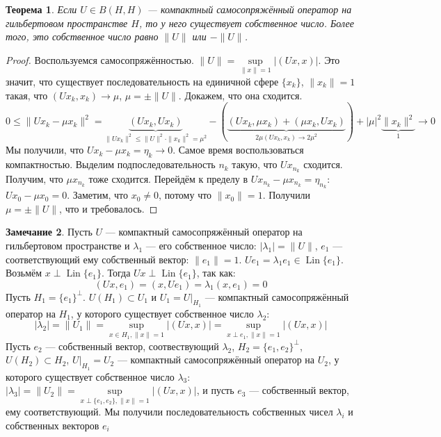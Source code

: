 \documentclass[11pt,openany,a4paper]{scrartcl}
\theoremstyle{plain}
\newtheorem{theorem}{Теорема}[subsection]
\theoremstyle{definition}
\newtheorem{remark}[theorem]{Замечание}
\DeclareMathOperator{\Lin}{Lin}
\begin{document}
\begin{theorem}
    Если $U \in B(H, H)$ — компактный самосопряжённый оператор на гильбертовом пространстве $H$, то
    у него существует собственное число. Более того, это собственное число равно $\|U\|$ или
    $-\|U\|$.
\end{theorem}
\begin{proof}
    Воспользуемся самосопряжённостью. $\|U\| = \sup\limits_{\|x\|=1}|(Ux, x)|$. Это значит,
    что существует последовательность на единичной сфере $\{x_k\}$, $\|x_k\|=1$ такая, что
    $(Ux_k, x_k) \to \mu$, $\mu = \pm \|U\|$. Докажем, что она сходится.
    $$
    0 \leqslant \|Ux_k - \mu x_k\|^2 =
    \underbrace{(Ux_k, Ux_k)}_{\|Ux_k\|^2 \leqslant \|U\|^2 \cdot \|x_k\|^2 = \mu^2} -
    (\underbrace{(Ux_k, \mu x_k) + (\mu x_k, Ux_k)}_{2\mu(Ux_k, x_k) \to 2 \mu^2})
    + |\mu|^2\underbrace{\|x_k\|^2}_{1} \to 0
    $$
    Мы получили, что $Ux_k - \mu x_k = \eta_k \to 0$. Самое время воспользоваться компактностью.
    Выделим подпоследовательность $n_k$ такую, что $Ux_{n_k}$ сходится. Получим, что
    $\mu x_{n_k}$ тоже сходится. Перейдём к пределу в $Ux_{n_k} - \mu x_{n_k} = \eta_{n_k}$:
    $Ux_0 - \mu x_0 = 0$. Заметим, что $x_0 \neq 0$, потому что $\|x_0\| = 1$. Получили
    $\mu = \pm \|U\|$, что и требовалось.
\end{proof}

\begin{remark}\label{eigennumber_sequence}
    Пусть $U$ — компактный самосопряжённый оператор на гильбертовом пространстве и $\lambda_1$ — 
    его собственное число: $|\lambda_1| = \|U\|$, $e_1$ — соответствующий ему собственный вектор:
    $\|e_1\| = 1$. $Ue_1 = \lambda_1 e_1 \in \Lin\{e_1\}$. Возьмём $x \perp \Lin\{e_1\}$. Тогда
    $Ux \perp \Lin\{e_1\}$, так как:
    $$
    (Ux, e_1) = (x, Ue_1) = \lambda_1(x, e_1) = 0
    $$
    Пусть $H_1 = \{e_1\}^\perp$. $U(H_1) \subset U_1$ и $U_1 = U|_{H_1}$ — компактный 
    самосопряжённый оператор на $H_1$, у которого существует собственное число
    $\lambda_2$:
    $$
    |\lambda_2| = \|U_1\| = \sup\limits_{x \in H_1, \|x\|=1} |(Ux, x)| =
    \sup\limits_{x \perp e_1, \|x\|=1} |(Ux, x)|
    $$
    Пусть $e_2$ — собственный вектор, соотвествующий $\lambda_2$, $H_2 = \{e_1, e_2\}^\perp$,
    $U(H_2) \subset H_2$, $U|_{H_1} = U_2$ — компактный самосопряжённый оператор на $U_2$, у 
    которого существует собственное число $\lambda_3$: $|\lambda_3| = \|U_2\| =
    \sup\limits_{x\perp\{e_1,e_2\}, \|x\|=1} |(Ux, x)|$, и пусть $e_3$ — собственный вектор, ему
    соответствующий. Мы получили последовательность собственных чисел $\lambda_i$ и собственных
    векторов $e_i$
\end{remark}
\end{document}
